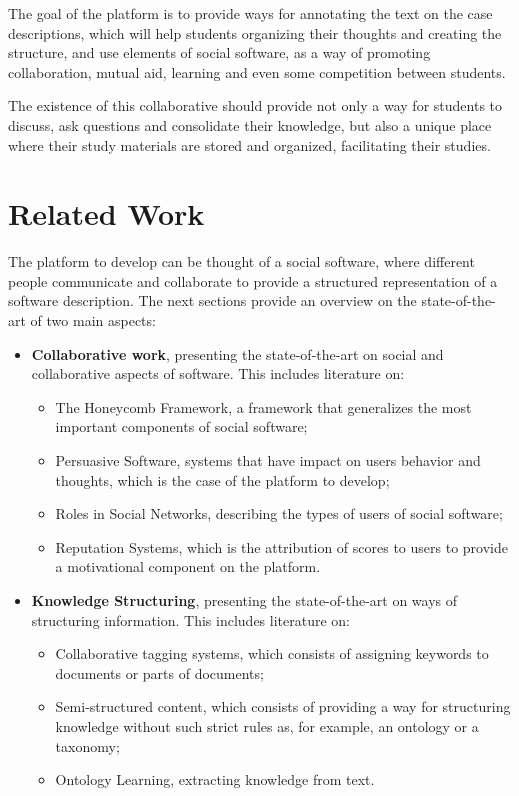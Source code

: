 \documentclass{llncs}
\begin{document}
The goal of the platform is to provide ways for annotating the text on the case descriptions, which will help students organizing their thoughts and creating the structure, and use elements of social software, as a way of promoting collaboration, mutual aid, learning and even some competition between students.
 
The existence of this collaborative should provide not only a way for students to discuss, ask questions and consolidate their knowledge, but also a unique place where their study materials are stored and organized, facilitating their studies.

\section{Related Work}
\label{relatedWork}
The platform to develop can be thought of a social software, where different people communicate and collaborate to provide a structured representation of a software description.
The next sections provide an overview on the state-of-the-art of two main aspects:
\begin{itemize}
\item \textbf{Collaborative work}, presenting the state-of-the-art on social and collaborative aspects of software. This includes literature on:
	\begin{itemize}
		\item The Honeycomb Framework, a framework that generalizes the most important components of social software;
		\item Persuasive Software, systems that have impact on users behavior and thoughts, which is the case of the platform to develop;
		\item Roles in Social Networks, describing the types of users of social software;
		\item Reputation Systems, which is the attribution of scores to users to provide a motivational component on the platform.
	\end{itemize}
	
\item \textbf{Knowledge Structuring}, presenting the state-of-the-art on ways of structuring information. This includes literature on:
	\begin{itemize}
		\item Collaborative tagging systems, which consists of assigning keywords to documents or parts of documents;
		\item Semi-structured content, which consists of providing a way for structuring knowledge without such strict rules as, for example, an ontology or a taxonomy;
		\item Ontology Learning, extracting knowledge from text.
	\end{itemize} 
\end{itemize}
\end{document}
